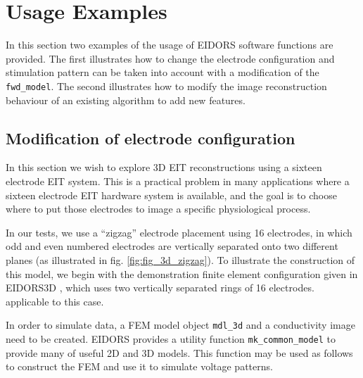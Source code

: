 \documentclass[12pt]{iopart}
\begin{document}
\section{ Usage Examples}

In this section two examples of the usage of EIDORS
software functions are provided. The first illustrates
how to change the electrode configuration and stimulation 
pattern can be taken
into account with a modification of the {\tt fwd\_model}.
The second illustrates how to modify the image reconstruction
behaviour of an existing algorithm to
add new features.

\subsection{Modification of electrode configuration}

In this section we wish to explore 3D EIT reconstructions
using a sixteen electrode EIT system. This is a practical
problem in many applications where a sixteen electrode
EIT hardware system is available, and the goal is to 
choose where to put those electrodes to image a specific
physiological process.

In our tests, we use a ``zigzag'' electrode placement 
using 16 electrodes, in which odd and even numbered
electrodes are vertically separated onto two different
planes (as illustrated in fig. \ref{fig:fig_3d_zigzag}).
To illustrate the construction of this model, we begin
with the demonstration finite element configuration
given in EIDORS3D \cite{Polydorides_and_Lionheart_2002},
which uses two vertically separated rings of 16 electrodes.
applicable to this case.

In order to simulate data, a FEM model object {\tt mdl\_3d}
and a conductivity image need to be created.
EIDORS provides a utility function {\tt mk\_common\_model}
to provide many of useful 2D and 3D models. This function
may be used as follows to construct the FEM and use it
to simulate voltage patterns.
\end{document}
